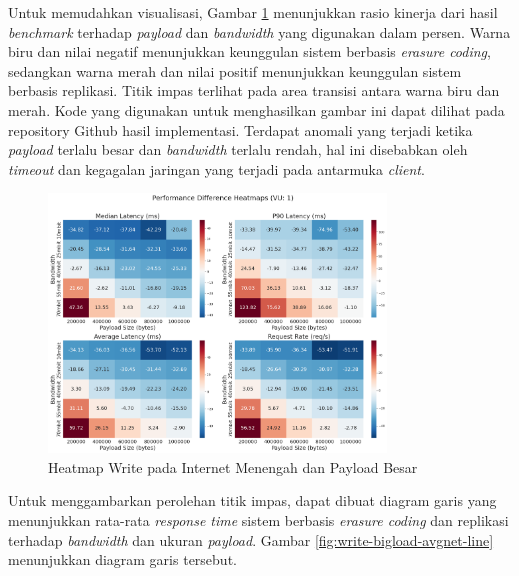 \begin{enumerate}
  Untuk memudahkan visualisasi, Gambar \ref{fig:write-bigload-avgnet-heatmap} menunjukkan rasio kinerja dari hasil \textit{benchmark} terhadap \textit{payload} dan \textit{bandwidth} yang digunakan dalam persen. Warna biru dan nilai negatif menunjukkan keunggulan sistem berbasis \textit{erasure coding}, sedangkan warna merah dan nilai positif menunjukkan keunggulan sistem berbasis replikasi. Titik impas terlihat pada area transisi antara warna biru dan merah.  Kode yang digunakan untuk menghasilkan gambar ini dapat dilihat pada repository Github hasil implementasi. Terdapat anomali yang terjadi ketika \textit{payload} terlalu besar dan \textit{bandwidth} terlalu rendah, hal ini disebabkan oleh \textit{timeout} dan kegagalan jaringan yang terjadi pada antarmuka \textit{client}.

  \begin{figure}[ht]
    \centering
    \includegraphics[width=0.8\textwidth]{resources/chapter-4/write_bigload_avgnet_heatmap.png}

    \caption{Heatmap Write pada Internet Menengah dan Payload Besar}
    \label{fig:write-bigload-avgnet-heatmap}
  \end{figure}

  Untuk menggambarkan perolehan titik impas, dapat dibuat diagram garis yang menunjukkan rata-rata \textit{response time} sistem berbasis \textit{erasure coding} dan replikasi terhadap \textit{bandwidth} dan ukuran \textit{payload}. Gambar \ref{fig:write-bigload-avgnet-line} menunjukkan diagram garis tersebut.


\end{enumerate}
